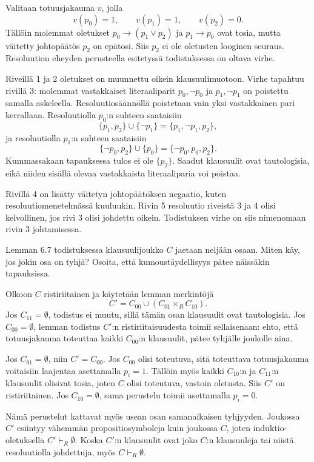 \documentclass[11pt,a4paper]{amsart}
\begin{document}
\begin{solution}
Valitaan totuusjakauma \(v\), jolla
\[
v(p_0)=1,\qquad v(p_1)=1,\qquad v(p_2)=0.
\]
Tällöin molemmat oletukset \(p_0\to(p_1\lor p_2)\) ja
\(p_1\to p_0\) ovat tosia, mutta väitetty johtopäätös \(p_2\) on
epätosi. Siis \(p_2\) ei ole oletusten looginen seuraus. Resoluution
eheyden perusteella esitetyssä todistuksessa on oltava virhe.

Riveillä 1 ja 2 oletukset on muunnettu oikein klausuulimuotoon.
Virhe tapahtuu rivillä 3: molemmat vastakkaiset literaaliparit
\(p_0,\neg p_0\) ja \(p_1,\neg p_1\) on poistettu samalla askeleella.
Resoluutiosäännöllä poistetaan vain yksi vastakkainen pari kerrallaan.
Resoluutiolla \(p_0\):n suhteen saataisiin
\[
\{p_1,p_2\}\cup\{\neg p_1\}=\{p_1,\neg p_1,p_2\},
\]
ja resoluutiolla \(p_1\):n suhteen saataisiin
\[
\{\neg p_0,p_2\}\cup\{p_0\}=\{\neg p_0,p_0,p_2\}.
\]
Kummassakaan tapauksessa tulos ei ole \(\{p_2\}\). Saadut klausuulit
ovat tautologisia, eikä niiden sisällä olevaa vastakkaista literaaliparia
voi poistaa.

Rivillä 4 on lisätty väitetyn johtopäätöksen negaatio, kuten
resoluutiomenetelmässä kuuluukin. Rivin 5 resoluutio riveistä 3 ja 4
olisi kelvollinen, jos rivi 3 olisi johdettu oikein. Todistuksen virhe
on siis nimenomaan rivin 3 johtamisessa.
\end{solution}

\begin{exercise}
Lemman 6.7 todistuksessa klausuulijoukko \(C\) jaetaan neljään osaan.
Miten käy, jos jokin osa on tyhjä? Osoita, että kumoustäydellisyys pätee
näissäkin tapauksissa.
\end{exercise}

\begin{solution}
Olkoon \(C\) ristiriitainen ja käytetään lemman merkintöjä
\[
C'=C_{00}\cup(C_{01}\times_R C_{10}).
\]
Jos \(C_{11}=\emptyset\), todistus ei muutu, sillä tämän osan klausuulit
ovat tautologisia. Jos \(C_{00}=\emptyset\), lemman todistus
\(C'\):n ristiriitaisuudesta toimii sellaisenaan: ehto, että totuusjakauma
toteuttaa kaikki \(C_{00}\):n klausuulit, pätee tyhjälle joukolle aina.

Jos \(C_{01}=\emptyset\), niin \(C'=C_{00}\). Jos \(C_{00}\) olisi
toteutuva, sitä toteuttava totuusjakauma voitaisiin laajentaa asettamalla
\(p_i=1\). Tällöin myös kaikki \(C_{10}\):n ja \(C_{11}\):n klausuulit
olisivat tosia, joten \(C\) olisi toteutuva, vastoin oletusta.
Siis \(C'\) on ristiriitainen. Jos \(C_{10}=\emptyset\), sama perustelu
toimii asettamalla \(p_i=0\).

Nämä perustelut kattavat myös usean osan samanaikaisen tyhjyyden.
Joukossa \(C'\) esiintyy vähemmän propositiosymboleja kuin joukossa
\(C\), joten induktio-oletuksella \(C'\vdash_R\emptyset\).
Koska \(C'\):n klausuulit ovat joko \(C\):n klausuuleja tai niistä
resoluutiolla johdettuja, myös \(C\vdash_R\emptyset\).
\end{solution}
\end{document}
